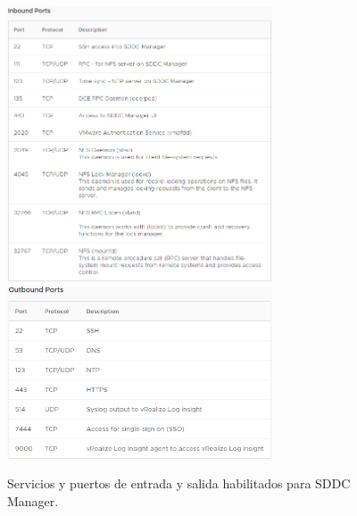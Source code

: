 \begin{figure}[h!]
  \centering
  \includegraphics[width=0.7\textwidth]{imaxes/conceptosPrevios/puertosentradaSDDC.png}
  \includegraphics[width=0.7\textwidth]{imaxes/conceptosPrevios/puertossalidaSDDC.png}
  \caption{Servicios y puertos de entrada y salida habilitados para SDDC Manager.}
  \label{fig:puertosSDDC}
\end{figure}
\fi

